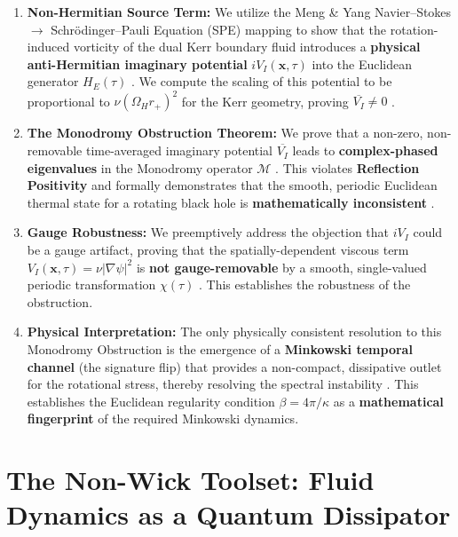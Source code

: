 \documentclass[11pt]{article}
\begin{document}
\begin{enumerate}
    \item \textbf{Non-Hermitian Source Term:} We utilize the Meng \& Yang Navier–Stokes $\to$ Schrödinger–Pauli Equation (SPE) mapping \cite{MengYang2024} to show that the rotation-induced vorticity of the dual Kerr boundary fluid introduces a \textbf{physical anti-Hermitian imaginary potential} $iV_I(\mathbf{x}, \tau)$ into the Euclidean generator $H_E(\tau)$ \cite{Explicit VI and Kerr scaling.txt}. We compute the scaling of this potential to be proportional to $\nu(\Omega_H r_+)^2$ for the Kerr geometry, proving $\overline{V_I} \neq 0$ \cite{Explicit VI and Kerr scaling.txt, appendix_a2_vorticity_calculation.tex}.

   \item \textbf{The Monodromy Obstruction Theorem:} We prove that a non-zero, non-removable time-averaged imaginary potential $\overline{V_I}$ leads to \textbf{complex-phased eigenvalues} in the Monodromy operator $\mathcal{M}$ \cite{Monodromy obstruction subsection.txt}. This violates \textbf{Reflection Positivity\cite{OsterwalderSchrader1973}} and formally demonstrates that the smooth, periodic Euclidean thermal state for a rotating black hole is \textbf{mathematically inconsistent} \cite{Monodromy obstruction subsection.txt}.

    \item \textbf{Gauge Robustness:} We preemptively address the objection that $iV_I$ could be a gauge artifact, proving that the spatially-dependent viscous term $V_I(\mathbf{x}, \tau) = \nu|\nabla\psi|^2$ is \textbf{not gauge-removable} by a smooth, single-valued periodic transformation $\chi(\tau)$ \cite{Gauge-removability lemma.txt}. This establishes the robustness of the obstruction.

    \item \textbf{Physical Interpretation:} The only physically consistent resolution to this Monodromy Obstruction is the emergence of a \textbf{Minkowski temporal channel} (the signature flip) that provides a non-compact, dissipative outlet for the rotational stress, thereby resolving the spectral instability \cite{appendix_a3_ns_spinor_mapping.tex}. This establishes the Euclidean regularity condition $\beta = 4\pi/\kappa$ \cite{GibbonsHawking1977} as a \textbf{mathematical fingerprint} of the required Minkowski dynamics.
\end{enumerate}
\section{The Non-Wick Toolset: Fluid Dynamics as a Quantum Dissipator}
\end{document}
